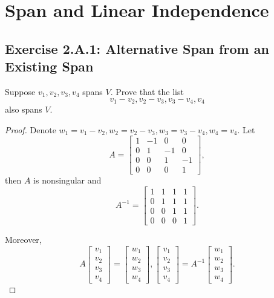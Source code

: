 \chapter{Span and Linear Independence}
\section{Exercise 2.A.1: Alternative Span from an Existing Span}
Suppose $v_1,v_2,v_3,v_4$ spans $V$. Prove that the list
\[
v_1-v_2,v_2-v_3,v_3-v_4,v_4
\] also spans $V$.
\begin{proof}
Denote $w_1=v_1-v_2, w_2=v_2-v_3, w_3=v_3-v_4, w_4=v_4$. Let
\[
A=\begin{bmatrix}
1& -1& 0&0\\
0& 1&-1&0\\
0& 0&1&-1\\
0& 0&0&1
\end{bmatrix},
\]
then $A$ is nonsingular and\[
A^{-1}=
\begin{bmatrix}
     1&     1&     1&     1\\
     0&     1&     1&     1\\
     0&     0&     1&     1\\
     0&     0&     0&     1
\end{bmatrix}.
\]

Moreover,\[
A\begin{bmatrix}
v_1\\
v_2\\
v_3\\
v_4\end{bmatrix}=\begin{bmatrix}
w_1\\
w_2\\
w_3\\
w_4\end{bmatrix},
\begin{bmatrix}
v_1\\
v_2\\
v_3\\
v_4\end{bmatrix}=A^{-1}\begin{bmatrix}
w_1\\
w_2\\
w_3\\
w_4\end{bmatrix}.
\]


\end{proof}
